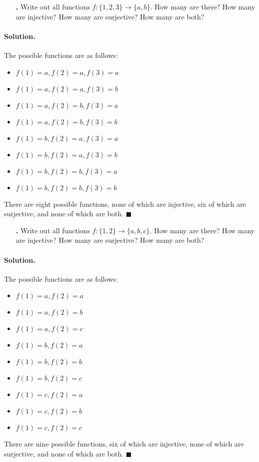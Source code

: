 \documentclass[12pt]{article}
\newenvironment{exercise}
  {\begin{enumerate}[left=0pt] \item[\textbf{\theexercise.}]}
  {\end{enumerate} \stepcounter{exercise}}
\newenvironment{solution}{\paragraph{Solution.}}{\hfill$\blacksquare$}
\begin{document}
\setcounter{exercise}{1}

\begin{exercise}
  Write out all functions $f : \{1, 2, 3\} \to \{a, b\}$. How many are there?
  How many are injective? How many are surjective? How many are both?
\end{exercise}

\begin{solution}
  The possible functions are as follows:

  \begin{itemize}[noitemsep]
    \item $f(1) = a, f(2) = a, f(3) = a$
    \item $f(1) = a, f(2) = a, f(3) = b$
    \item $f(1) = a, f(2) = b, f(3) = a$
    \item $f(1) = a, f(2) = b, f(3) = b$
    \item $f(1) = b, f(2) = a, f(3) = a$
    \item $f(1) = b, f(2) = a, f(3) = b$
    \item $f(1) = b, f(2) = b, f(3) = a$
    \item $f(1) = b, f(2) = b, f(3) = b$
  \end{itemize}

  There are eight possible functions, none of which are injective, six of which
  are surjective, and none of which are both.
\end{solution}

\begin{exercise}
  Write out all functions $f : \{1, 2\} \to \{a, b, c\}$. How many are there?
  How many are injective? How many are surjective? How many are both?
\end{exercise}

\begin{solution}
  The possible functions are as follows:

  \begin{itemize}[noitemsep]
    \item $f(1) = a, f(2) = a$
    \item $f(1) = a, f(2) = b$
    \item $f(1) = a, f(2) = c$
    \item $f(1) = b, f(2) = a$
    \item $f(1) = b, f(2) = b$
    \item $f(1) = b, f(2) = c$
    \item $f(1) = c, f(2) = a$
    \item $f(1) = c, f(2) = b$
    \item $f(1) = c, f(2) = c$
  \end{itemize}

  There are nine possible functions, six of which are injective, none of which
  are surjective, and none of which are both.
\end{solution}
\end{document}
